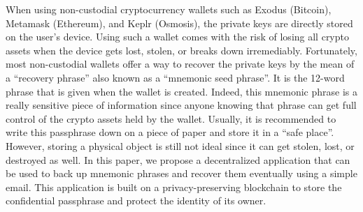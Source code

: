 When using non-custodial cryptocurrency wallets such as Exodus (Bitcoin), Metamask (Ethereum), and Keplr (Osmosis), the private keys are directly stored on the user's device. Using such a wallet comes with the risk of losing all crypto assets when the device gets lost, stolen, or breaks down irremediably. Fortunately, most non-custodial wallets offer a way to recover the private keys by the mean of a ``recovery phrase'' also known as a ``mnemonic seed phrase''. It is the 12-word phrase that is given when the wallet is created. Indeed, this mnemonic phrase is a really sensitive piece of information since anyone knowing that phrase can get full control of the crypto assets held by the wallet. Usually, it is recommended to write this passphrase down on a piece of paper and store it in a “safe place”. However, storing a physical object is still not ideal since it can get stolen, lost, or destroyed as well. In this paper, we propose a decentralized application that can be used to back up mnemonic phrases and recover them eventually using a simple email. This application is built on a privacy-preserving blockchain to store the confidential passphrase and protect the identity of its owner.